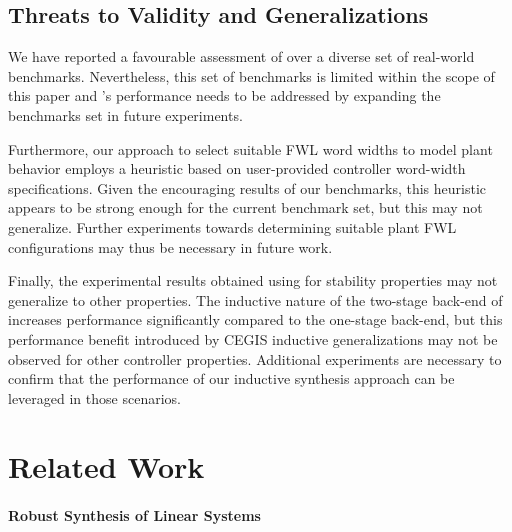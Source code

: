\documentclass[final]{sig-alternate-05-2015}
\begin{document}
\subsection{Threats to Validity and Generalizations}

We have reported a favourable assessment of \tool over a diverse set of real-world
benchmarks. Nevertheless, this set of benchmarks is limited within the
scope of this paper and \tool's performance 
needs to be addressed by expanding the benchmarks set
in future experiments.

Furthermore, our approach to select suitable FWL word widths to model
plant behavior employs a heuristic based on user-provided controller
word-width specifications.  Given the encouraging results of our benchmarks,
this heuristic appears to be strong enough for the current benchmark set,
but this may not generalize.  Further experiments towards determining
suitable plant FWL configurations may thus be necessary in future work.

Finally, the experimental results obtained using \tool for stability
properties may not generalize to other properties.  The inductive nature of
the two-stage back-end of \tool increases performance significantly compared
to the one-stage back-end, but this performance benefit introduced by CEGIS 
inductive generalizations may not be observed for other controller 
properties.  Additional experiments are necessary to confirm that the
performance of our inductive synthesis approach can be leveraged in those
scenarios.

\section{Related Work}\label{sec:related}

\paragraph{Robust Synthesis of Linear Systems} 
\end{document}
